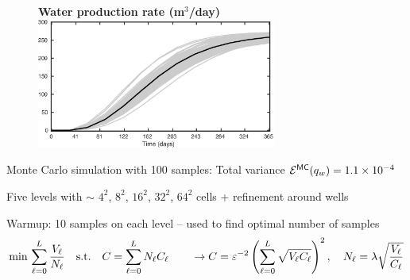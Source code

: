 \begin{frame}{\name{}}
    \begin{figure}
        \centering
        \textbf{Water production rate (m$^3$/day)}
        \includegraphics[width = 0.7\textwidth]{figures/example-1/water-rate.eps}
    \end{figure}
    \begin{squarelist}
        \item Monte Carlo simulation with 100 samples: Total variance $\mathcal{E}^{\mathsf{MC}}(q_w) = 1.1\times10^{-4}$
    \end{squarelist}
\end{frame}

\begin{frame}{\name{}}
    \begin{figure}
        \centering
    \end{figure}
    \begin{squarelist}
        \item<1-> Five levels with $\sim$ $4^2$, $8^2$, $16^2$, $32^2$, $64^2$ cells + refinement around wells
        \item<2-> Warmup: 10 samples on each level -- used to find optimal number of samples
        \begin{equation*}
            \min\, \sum_{\ell = 0}^L\frac{V_\ell}{N_\ell} \quad \text{s.t.} \quad C = \sum_{\ell = 0}^L N_\ell C_\ell \qquad \rightarrow C = \varepsilon^{-2}\left(\sum_{\ell = 0}^L \sqrt{V_\ell C_\ell}\right)^2, \quad N_\ell = \lambda\sqrt{\frac{V_\ell}{C_\ell}}
\end{equation*}
    \end{squarelist}
\end{frame}

